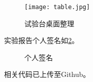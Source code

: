 \documentclass[dvipsnames, svgnames,a4paper,11pt]{article}
\begin{document}
	\begin{figure}[htbp]
		\centering
		\texttt{[image: table.jpg]}
		\caption{试验台桌面整理}
		\label{fig:table}
	\end{figure}
	
	实验报告个人签名如\cref{fig:name}。
	
	\begin{figure}[htbp]
		\centering
		\caption{个人签名}
		\label{fig:name}			
	\end{figure}

	
	
	相关代码已上传至Github。
	
	
	
\end{document}
